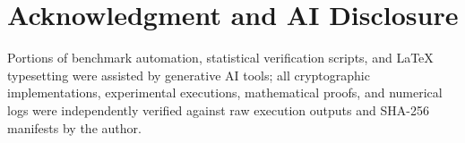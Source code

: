 \documentclass[10pt,journal,compsoc]{IEEEtran}
\begin{document}
\section*{Acknowledgment and AI Disclosure}
Portions of benchmark automation, statistical verification scripts, and LaTeX typesetting were assisted by generative AI tools; all cryptographic implementations, experimental executions, mathematical proofs, and numerical logs were independently verified against raw execution outputs and SHA-256 manifests by the author.



\end{document}
